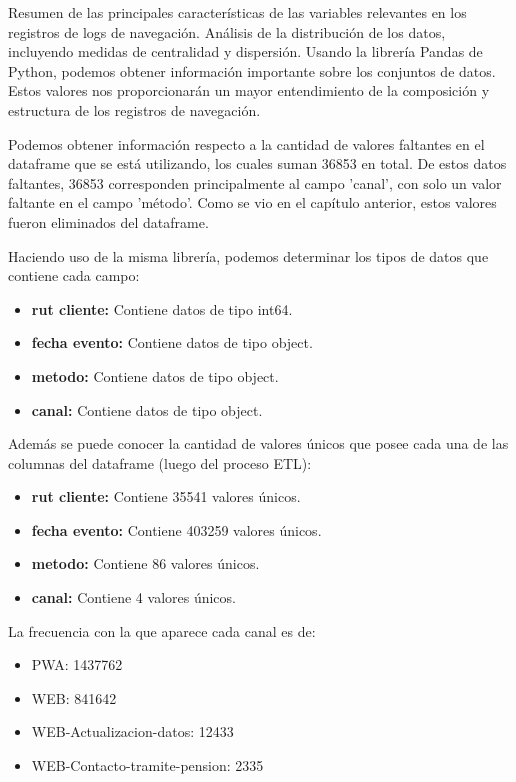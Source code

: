 Resumen de las principales características de las variables relevantes en los registros de logs de navegación. Análisis de la distribución de los datos, incluyendo medidas de centralidad y dispersión. Usando la librería Pandas de Python, podemos obtener información importante sobre los conjuntos de datos. Estos valores nos proporcionarán un mayor entendimiento de la composición y estructura de los registros de navegación.

Podemos obtener información respecto a la cantidad de valores faltantes en el dataframe que se está utilizando, los cuales suman 36853 en total. De estos datos faltantes, 36853 corresponden principalmente al campo 'canal', con solo un valor faltante en el campo 'método'. Como se vio en el capítulo anterior, estos valores fueron eliminados del dataframe.

Haciendo uso de la misma librería, podemos determinar los tipos de datos que contiene cada campo:

\begin{itemize}
    \item \textbf{rut cliente:} Contiene datos de tipo int64.
    \item \textbf{fecha evento:} Contiene datos de tipo object.
    \item \textbf{metodo:} Contiene datos de tipo object.
    \item \textbf{canal:} Contiene datos de tipo object.
\end{itemize}

Además se puede conocer la cantidad de valores únicos que posee cada una de las columnas del dataframe (luego del proceso ETL):

\begin{itemize}
    \item \textbf{rut cliente:} Contiene 35541 valores únicos.
    \item \textbf{fecha evento:} Contiene 403259 valores únicos.
    \item \textbf{metodo:} Contiene 86 valores únicos.
    \item \textbf{canal:} Contiene 4 valores únicos.
\end{itemize}

La frecuencia con la que aparece cada canal es de:
\begin{itemize}
    \item PWA: 1437762
    \item WEB: 841642
    \item WEB-Actualizacion-datos: 12433
    \item WEB-Contacto-tramite-pension: 2335
\end{itemize}

